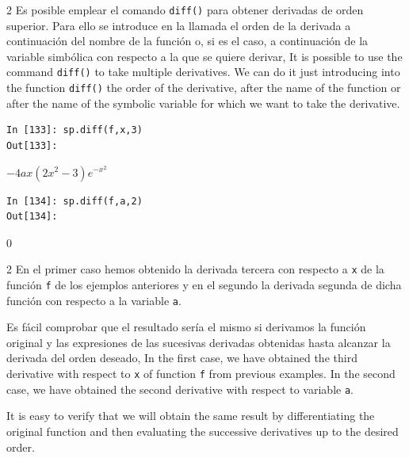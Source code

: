 \begin{paracol}{2}
Es posible emplear el comando \texttt{diff()} para obtener derivadas de orden superior. Para ello se introduce en la llamada el orden de la derivada a continuación del nombre de la función o, si es el caso, a continuación de la variable simbólica con respecto a la que se quiere derivar,
\switchcolumn
It is possible to use the command \texttt{diff()} to take multiple derivatives. We can do it just introducing into the function \texttt{diff()} the order of the derivative, after the name of the function or after the name of the symbolic variable for which we want to take the derivative. 
\end{paracol}
\begin{center}
	\begin{minipage}{.5\textwidth}
		\begin{verbatim}
In [133]: sp.diff(f,x,3)
Out[133]: 

		\end{verbatim}
		$-4ax(2x^2-3)e^{-x^2}$
		\begin{verbatim}
In [134]: sp.diff(f,a,2)
Out[134]: 
		\end{verbatim}
		$0$
	\end{minipage}
\end{center}
\begin{paracol}{2}
En el primer caso hemos obtenido la derivada tercera con respecto a \texttt{x} de la función \texttt{f} de los ejemplos anteriores y en el segundo la derivada segunda de dicha función con respecto a la variable \texttt{a}. 

Es fácil comprobar que el resultado sería el mismo si derivamos la función original y las expresiones de las sucesivas derivadas obtenidas hasta alcanzar la derivada del orden deseado,
\switchcolumn
In the first case, we have obtained the third derivative with respect to \texttt{x} of function \texttt{f} from previous examples. In the second case, we have obtained the second derivative with respect to variable \texttt{a}.

It is easy to verify that we will obtain the same result by differentiating the original function and then evaluating the successive derivatives up to the desired order.   

\end{paracol}

